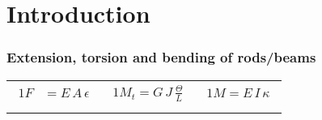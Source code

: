 \section*{Introduction}


\begin{frame}
  \frametitle{Extension, torsion and bending of rods/beams}
  \begin{tabularx}{\linewidth}{XXX}
    {
    \begin{alignat*}{1}
      F &= E \, A \, \epsilon \\
    \end{alignat*}
    } & {
    \begin{alignat*}{1}
      M_t = G \, J \, \frac{\Theta}{L} \\
    \end{alignat*}
    } & {
    \begin{alignat*}{1}
      M = E \, I \, \kappa \\
    \end{alignat*}
    }
  \end{tabularx}  
\end{frame}


